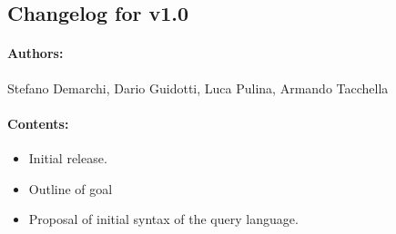\subsection*{Changelog for v1.0}

\paragraph{Authors:} Stefano Demarchi, Dario Guidotti, Luca Pulina, Armando Tacchella

\paragraph{Contents:}
\begin{itemize}
\item Initial release.
\item Outline of goal
\item Proposal of initial syntax of the query language.
\end{itemize}
